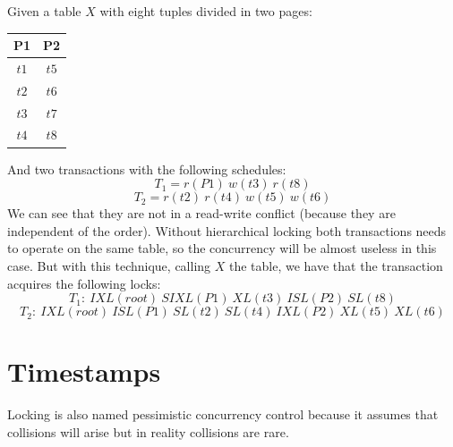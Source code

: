 \documentclass[12pt, a4paper]{report}
\newtheorem[style=M,bodystyle=\normalfont]{theorem}{Theorem}
\newtheorem[style=M,bodystyle=\normalfont]{corollary}{Corollary}
\newtheorem[style=M,bodystyle=\normalfont]{lemma}{Lemma}
\newtheorem[style=M,bodystyle=\normalfont]{definition}{Definition}
\begin{document}
\begin{itemize}
\begin{table}[H]
\begin{tabular}{ccccccc}
            \end{tabular}
        \end{table}
        \begin{example}
            Given a table $X$ with eight tuples divided in two pages: 
            \begin{table}[H]
                \centering
                \begin{tabular}{cc}
                \textbf{P1}                 & \textbf{P2}               \\ \hline
                \multicolumn{1}{|c|}{$t1$}  & \multicolumn{1}{c|}{$t5$} \\ \hline
                \multicolumn{1}{|c|}{$t2$}  & \multicolumn{1}{c|}{$t6$} \\ \hline
                \multicolumn{1}{|c|}{$t3$}  & \multicolumn{1}{c|}{$t7$} \\ \hline
                \multicolumn{1}{|c|}{$t4$}  & \multicolumn{1}{c|}{$t8$} \\ \hline
                \end{tabular}
            \end{table}
            And two transactions with the following schedules: 
            \[T_1=r(P1)\:w(t3)\:r(t8)\]
            \[T_2=r(t2)\:r(t4)\:w(t5)\:w(t6)\]
            We can see that they are not in a read-write conflict (because they are independent of the order). Without hierarchical locking both transactions needs to operate on the 
            same table, so the concurrency will be almost useless in this case. But with this technique, calling $X$ the table, we have that the transaction acquires the following
            locks: 
            \[T_1:\:IXL(root)\:SIXL(P1)\:XL(t3)\:ISL(P2)\:SL(t8)\]
            \[T_2:\:IXL(root)\:ISL(P1)\:SL(t2)\:SL(t4)\:IXL(P2)\:XL(t5)\:XL(t6)\]
        \end{example}
    \end{itemize}

    \section{Timestamps}
    Locking is also named pessimistic concurrency control because it assumes that collisions will arise but in reality collisions are rare. 
    
\end{document}
